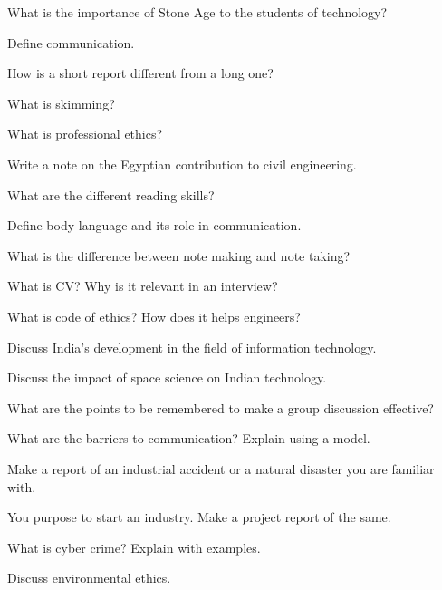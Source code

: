 \partA

\iitem What is the importance of Stone Age to the students of technology?
\item Define communication.
\item How is a short report different from a long one?
\item What is skimming?
\item What is professional ethics?

\markA
\partB

\item Write a note on the Egyptian contribution to civil engineering.
\item What are the different reading skills?
\item Define body language and its role in communication.
\item What is the difference between note making and note taking?
\item What is CV? Why is it relevant in an interview?
\item What is code of ethics? How does it helps engineers?

\markB
\partC

\item \iitem Discuss India's development in the field of information technology.
\Or
\item Discuss the impact of space science on Indian technology.
\ene

\newpage \again

\item \iitem What are the points to be remembered to make a group discussion effective?
\Or
\item What are the barriers to communication? Explain using a model.
\ene

\item \iitem Make a report of an industrial accident or a natural disaster you are familiar with.
\Or
\item You purpose to start an industry. Make a project report of the same.
\ene

\item \iitem What is cyber crime? Explain with examples.
\Or
\item Discuss environmental ethics.
\ene

\markC
\ene



